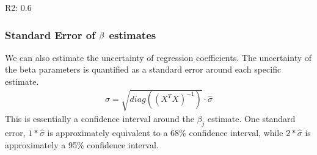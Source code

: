 \documentclass[letterpaper,10pt,english]{sphinxmanual}
\begin{document}
\begin{sphinxVerbatim}[commandchars=\\\{\}]
R\PYGZca{}2: 0.6
\end{sphinxVerbatim}


\subsubsection{Standard Error of \protect\(\beta\protect\) estimates}
\label{\detokenize{content/GLM:standard-error-of-beta-estimates}}
We can also estimate the uncertainty of regression coefficients. The uncertainty of the beta parameters is quantified as a standard error around each specific estimate.
\begin{equation*}
\begin{split}\sigma = \sqrt{diag((X^TX)^{-1})} \cdot \hat \sigma\end{split}
\end{equation*}
This is essentially a confidence interval around the \(\beta_j\) estimate. One standard error, \(1*\hat \sigma\) is approximately equivalent to a 68\% confidence interval, while \(2*\hat\sigma\) is approximately a 95\% confidence interval.

\begin{sphinxVerbatim}[commandchars=\\\{\}]
     

\PYG{p}{[} \PYG{p}{]}    
 
 
\end{sphinxVerbatim}
\end{document}
